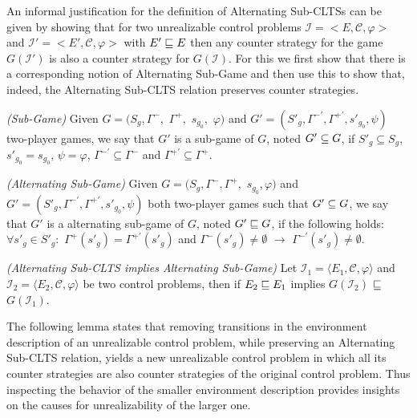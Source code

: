 An informal justification for the definition of Alternating Sub-CLTSs can be given by showing that for two unrealizable control problems $\mathcal{I} = <E, \mathcal{C}, \varphi>$ and $\mathcal{I'} = <E', \mathcal{C}, \varphi>$ with $E' \sqsubseteq E$ then any counter strategy for the game $G(\mathcal{I'})$ is also a counter strategy for $G(\mathcal{I})$. For this we first show that there is a corresponding notion of Alternating Sub-Game and then use this to show that, indeed, the Alternating Sub-CLTS relation preserves counter strategies.  


\begin{definition}\label{def:sub-game}\emph{(Sub-Game)}
Given $G = (S_g, \Gamma^{-},$ $\Gamma^{+},$ $s_{g_{0}}$$,$ $\varphi)$ and
$G' = (S'_g, \Gamma^{-\prime}, \Gamma^{+\prime},s'_{g_{0}}, \psi)$ two-player games, we say that $G'$ is a sub-game of $G$, noted
$G' \subseteq G$, if $S'_g \subseteq S_g$, $s'_{g_{0}}=s_{g_{0}}$, $\psi = \varphi$, $\Gamma^{-\prime}\subseteq \Gamma^{-}$ and
$\Gamma^{+\prime}\subseteq \Gamma^{+}$.
\end{definition}

\begin{definition}\label{def:alternating-sub-game}\emph{(Alternating Sub-Game)}
Given $G = (S_g, \Gamma^{-}, \Gamma^{+},$ $s_{g_{0}}, \varphi)$ and
$G' = (S'_g, \Gamma^{-\prime}, \Gamma^{+\prime},s'_{g_{0}}, \psi)$ both two-player games such that $G' \subseteq G$, we say that $G'$ is a alternating sub-game of $G$, noted
$G'\sqsubseteq G$, if the following holds: $\forall s'_g \in S'_g:$ 
$\Gamma^{+}(s'_g)=\Gamma^{+\prime}(s'_g)$ and $\Gamma^{-}(s'_g)\neq \emptyset$ $\rightarrow$ $\Gamma^{-\prime}(s'_g) \neq \emptyset$. 
\end{definition}

\begin{lemma}\emph{(Alternating Sub-CLTS implies Alternating Sub-Game)}\label{theorem:alternating-sub-game}
Let $\mathcal{I}_1 = \langle E_1, \mathcal{C}, \varphi \rangle$ and
$\mathcal{I}_2 = \langle E_2, \mathcal{C}, \varphi \rangle$ be two
control problems, then if $E_2 \sqsubseteq E_1$ implies $G(\mathcal{I}_2)$
$\sqsubseteq$ $G(\mathcal{I}_1)$.
\end{lemma}

%

The following lemma states that removing transitions in the environment description of an unrealizable control problem, while preserving an Alternating Sub-CLTS relation, yields a new unrealizable control problem in which all its counter strategies are also counter strategies of the original control problem. Thus inspecting the behavior of the smaller environment description provides insights on the causes for unrealizability of the larger one.  


